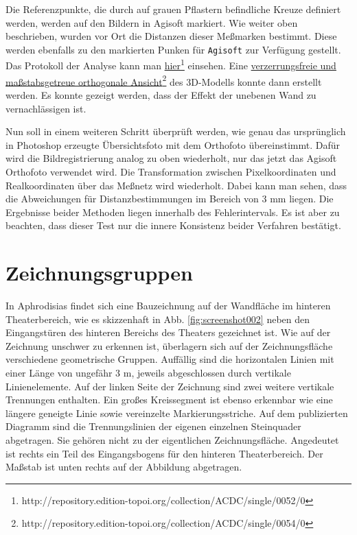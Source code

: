 \documentclass[twocolumn]{bmcart}
\begin{document}
Die Referenzpunkte, die durch auf grauen Pflastern befindliche Kreuze definiert werden, werden auf den Bildern in Agisoft markiert. Wie weiter oben beschrieben, wurden vor Ort die Distanzen dieser Meßmarken bestimmt. Diese werden ebenfalls zu den markierten Punken für \texttt{Agisoft} zur Verfügung gestellt. Das Protokoll der Analyse kann man \href{http://repository.edition-topoi.org/collection/ACDC/single/0052/0}{hier}\footnote{http://repository.edition-topoi.org/collection/ACDC/single/0052/0} einsehen. Eine \href{http://repository.edition-topoi.org/collection/ACDC/single/0054/0}{verzerrungsfreie und maßstabsgetreue orthogonale Ansicht}\footnote{http://repository.edition-topoi.org/collection/ACDC/single/0054/0} des 3D-Modells konnte dann erstellt werden. Es konnte gezeigt werden, dass der Effekt der unebenen Wand zu vernachlässigen ist.

Nun soll in einem weiteren Schritt überprüft werden, wie genau das ursprünglich in Photoshop erzeugte Übersichtsfoto mit dem Orthofoto 
übereinstimmt. Dafür wird die Bildregistrierung analog zu oben wiederholt, nur das jetzt das Agisoft Orthofoto verwendet wird.
Die Transformation zwischen Pixelkoordinaten und Realkoordinaten über das Meßnetz wird wiederholt. Dabei kann man sehen, dass die 
Abweichungen für Distanzbestimmungen im Bereich von 3 mm liegen. Die Ergebnisse beider Methoden liegen innerhalb des Fehlerintervals.
Es ist aber zu beachten, dass dieser Test nur die innere Konsistenz beider Verfahren bestätigt.


\section{Zeichnungsgruppen}

In Aphrodisias findet sich eine Bauzeichnung auf der Wandfläche im hinteren Theaterbereich, wie es skizzenhaft in Abb. \ref{fig:screenshot002} neben den Eingangstüren des hinteren Bereichs des Theaters gezeichnet ist. Wie auf der Zeichnung unschwer zu erkennen ist, überlagern sich auf der Zeichnungsfläche verschiedene geometrische Gruppen. Auffällig sind die horizontalen Linien mit einer Länge von ungefähr 3 m, jeweils abgeschlossen durch vertikale Linienelemente. Auf der linken Seite der Zeichnung sind zwei weitere vertikale Trennungen enthalten. Ein großes Kreissegment ist ebenso erkennbar wie eine längere geneigte Linie sowie vereinzelte Markierungsstriche. Auf dem publizierten Diagramm sind die Trennungslinien der eigenen einzelnen Steinquader abgetragen. Sie gehören nicht zu der eigentlichen   Zeichnungsfläche. Angedeutet ist rechts ein Teil des Eingangsbogens für den hinteren Theaterbereich. Der Maßstab ist unten rechts auf der Abbildung abgetragen.
\end{document}
